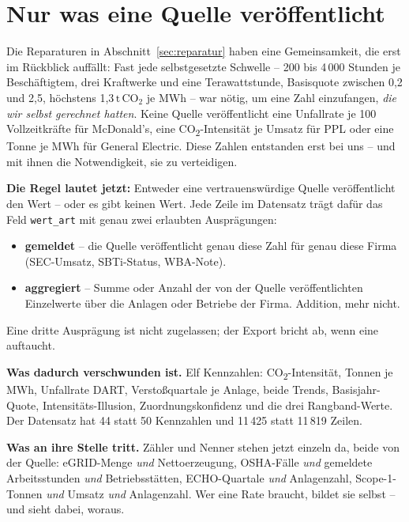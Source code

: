 \documentclass[11pt,a4paper]{article}
\newcommand{\tco}{\ensuremath{\mathrm{t\,CO}_{2}}}
\newcommand{\befund}[1]{%
  \par\vspace{2pt}\noindent\colorbox{softgrey}{%
  \begin{minipage}{\dimexpr\linewidth-2\fboxsep}\small\vspace{3pt}#1\vspace{3pt}\end{minipage}}\par\vspace{4pt}}
\begin{document}
\section{Nur was eine Quelle veröffentlicht}
\label{sec:nurquelle}

Die Reparaturen in Abschnitt~\ref{sec:reparatur} haben eine Gemeinsamkeit, die erst im Rückblick auffällt: Fast jede selbstgesetzte Schwelle -- 200 bis 4\,000 Stunden je Beschäftigtem, drei Kraftwerke und eine Terawattstunde, Basisquote zwischen 0{,}2 und 2{,}5, höchstens 1{,}3\,\tco{} je MWh -- war nötig, um eine Zahl einzufangen, \emph{die wir selbst gerechnet hatten}. Keine Quelle veröffentlicht eine Unfallrate je 100 Vollzeitkräfte für McDonald's, eine CO\textsubscript{2}-Intensität je Umsatz für PPL oder eine Tonne je MWh für General Electric. Diese Zahlen entstanden erst bei uns -- und mit ihnen die Notwendigkeit, sie zu verteidigen.

\befund{\textbf{Die Regel lautet jetzt:} Entweder eine vertrauenswürdige Quelle veröffentlicht den Wert -- oder es gibt keinen Wert. Jede Zeile im Datensatz trägt dafür das Feld \texttt{wert\_art} mit genau zwei erlaubten Ausprägungen:
\begin{itemize}
\item \textbf{gemeldet} -- die Quelle veröffentlicht genau diese Zahl für genau diese Firma (SEC-Umsatz, SBTi-Status, WBA-Note).
\item \textbf{aggregiert} -- Summe oder Anzahl der von der Quelle veröffentlichten Einzelwerte über die Anlagen oder Betriebe der Firma. Addition, mehr nicht.
\end{itemize}
Eine dritte Ausprägung ist nicht zugelassen; der Export bricht ab, wenn eine auftaucht.}

\textbf{Was dadurch verschwunden ist.} Elf Kennzahlen: CO\textsubscript{2}-Intensität, Tonnen je MWh, Unfallrate DART, Verstoßquartale je Anlage, beide Trends, Basisjahr-Quote, Intensitäts-Illusion, Zuordnungskonfidenz und die drei Rangband-Werte. Der Datensatz hat 44 statt 50 Kennzahlen und 11\,425 statt 11\,819 Zeilen.

\textbf{Was an ihre Stelle tritt.} Zähler und Nenner stehen jetzt einzeln da, beide von der Quelle: eGRID-Menge \emph{und} Nettoerzeugung, OSHA-Fälle \emph{und} gemeldete Arbeitsstunden \emph{und} Betriebsstätten, ECHO-Quartale \emph{und} Anlagenzahl, Scope-1-Tonnen \emph{und} Umsatz \emph{und} Anlagenzahl. Wer eine Rate braucht, bildet sie selbst -- und sieht dabei, woraus.
\end{document}

